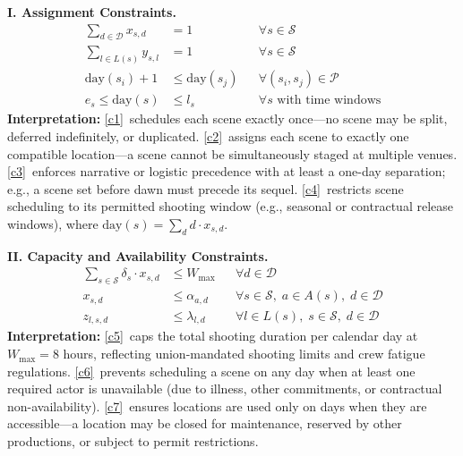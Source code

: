 \medskip
\noindent\textbf{I. Assignment Constraints.}
\vspace{-4pt}
\begin{align}
\sum_{d \in \mathcal{D}} x_{s,d} &= 1 && \forall s \in \mathcal{S} \tag{C1}\label{c1}\\
\sum_{l \in L(s)} y_{s,l} &= 1 && \forall s \in \mathcal{S} \tag{C2}\label{c2}\\
\text{day}(s_i) + 1 &\leq \text{day}(s_j) && \forall (s_i, s_j) \in \mathcal{P} \tag{C3}\label{c3}\\
e_s \leq \text{day}(s) &\leq l_s && \forall s \text{ with time windows} \tag{C4}\label{c4}
\end{align}
\textbf{Interpretation:}
\ref{c1}~schedules each scene exactly once---no scene may be split, deferred indefinitely, or duplicated.
\ref{c2}~assigns each scene to exactly one compatible location---a scene cannot be simultaneously staged at multiple venues.
\ref{c3}~enforces narrative or logistic precedence with at least a one-day separation; e.g., a scene set before dawn must precede its sequel.
\ref{c4}~restricts scene scheduling to its permitted shooting window (e.g., seasonal or contractual release windows), where $\text{day}(s) = \sum_{d} d \cdot x_{s,d}$.

\medskip
\noindent\textbf{II. Capacity and Availability Constraints.}
\vspace{-4pt}
\begin{align}
\sum_{s \in \mathcal{S}} \delta_s \cdot x_{s,d} &\leq W_{\max} && \forall d \in \mathcal{D} \tag{C5}\label{c5}\\
x_{s,d} &\leq \alpha_{a,d} && \forall s \in \mathcal{S},\; a \in A(s),\; d \in \mathcal{D} \tag{C6}\label{c6}\\
z_{l,s,d} &\leq \lambda_{l,d} && \forall l \in L(s),\; s \in \mathcal{S},\; d \in \mathcal{D} \tag{C7}\label{c7}
\end{align}
\textbf{Interpretation:}
\ref{c5}~caps the total shooting duration per calendar day at $W_{\max} = 8$ hours, reflecting union-mandated shooting limits and crew fatigue regulations.
\ref{c6}~prevents scheduling a scene on any day when at least one required actor is unavailable (due to illness, other commitments, or contractual non-availability).
\ref{c7}~ensures locations are used only on days when they are accessible---a location may be closed for maintenance, reserved by other productions, or subject to permit restrictions.

